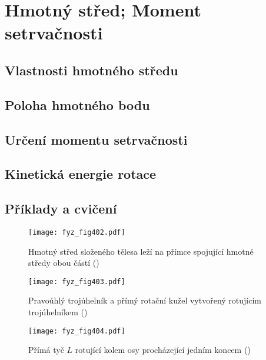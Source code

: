 \chapter{Hmotný střed; Moment setrvačnosti}\label{fyz:IchapXIX}
\minitoc
  \section{Vlastnosti hmotného středu}\label{fyz:IchapXIXsecI}
  \section{Poloha hmotného bodu}\label{fyz:IchapXIXsecII}
  \section{Určení momentu setrvačnosti}\label{fyz:IchapXIXsecIII}
  \section{Kinetická energie rotace}\label{fyz:IchapXIXsecIV}
  \section{Příklady a cvičení}\label{fyz:IchapXIXsecV}

  \begin{figure}[ht!] %
    \centering
    \texttt{[image: fyz\_fig402.pdf]}
    \caption{Hmotný střed složeného tělesa leží na přímce spojující hmotné středy obou částí
             (\cite[s.~260]{Feynman01})}
    \label{fyz_fig402}
  \end{figure}

  \begin{figure}[ht!] %
    \centering
    \texttt{[image: fyz\_fig403.pdf]}
    \caption{Pravoúhlý trojúhelník a přímý rotační kužel vytvořený rotujícím trojúhelníkem 
             (\cite[s.~263]{Feynman01})}
    \label{fyz_fig403}
  \end{figure}
  \begin{figure}[ht!] %
    \centering
    \texttt{[image: fyz\_fig404.pdf]}
    \caption{Přímá tyč \(L\) rotující kolem osy procházející jedním koncem
             (\cite[s.~264]{Feynman01})}
    \label{fyz_fig404}
  \end{figure}

